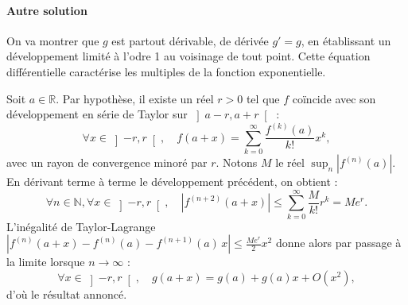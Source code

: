 









\paragraph{Autre solution} %
On va montrer que $g$ est partout dérivable, de dérivée $g'=g$, en établissant un développement limité à l'odre 1 au voisinage de tout point. Cette équation différentielle caractérise les multiples de la fonction exponentielle.

Soit $a \in \mathbb R$. Par hypothèse, il existe un réel $r > 0$ tel que $f$ coïncide avec son développement en série de Taylor sur $\left]a-r,a+r\right[$ :
\[
\forall x \in \left]-r,r\right[,\quad f(a+x) = \sum_{k=0}^\infty \frac{f^{(k)}(a)}{k!}x^k,
\]
avec un rayon de convergence minoré par $r$. Notons $M$ le réel $\sup_n |f^{(n)}(a)|$. En dérivant terme à terme le développement précédent, on obtient :
\[
\forall n\in\mathbb N,\forall x \in \left]-r,r\right[,\quad |f^{(n+2)}(a+x)| \leqslant \sum_{k=0}^\infty \frac{M}{k!}r^k = Me^{r}.
\]
L'inégalité de Taylor-Lagrange $\left|f^{(n)}(a+x) - f^{(n)}(a) -  f^{(n+1)}(a)\,x\right| \leqslant \frac{Me^{r}}2 x^2$ donne alors par passage à la limite lorsque $n \to \infty$ :
\[
\forall x \in \left]-r,r\right[,\quad g(a+x) = g(a) + g(a) x + O(x^2),
\]
d'où le résultat annoncé.


